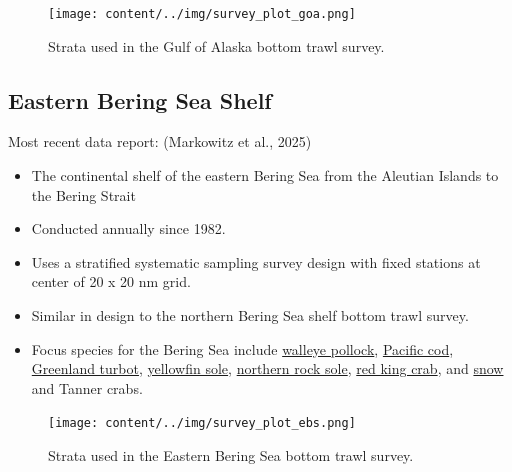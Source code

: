 \documentclass[
  letterpaper,
  oneside,
  open=any]{scrbook}
\providecommand{\tightlist}{%
  \setlength{\itemsep}{0pt}\setlength{\parskip}{0pt}}\usepackage{longtable,booktabs,array}
\begin{document}
\begin{figure}[H]

{\centering \texttt{[image: content/../img/survey\_plot\_goa.png]}

}

\caption{Strata used in the Gulf of Alaska bottom trawl survey.}

\end{figure}%

\subsection{\texorpdfstring{\textbf{Eastern Bering Sea
Shelf}}{Eastern Bering Sea Shelf}}\label{eastern-bering-sea-shelf}

Most recent data report: (Markowitz et al., 2025)

\begin{itemize}
\tightlist
\item
  The continental shelf of the eastern Bering Sea from the Aleutian
  Islands to the Bering Strait
\item
  Conducted annually since 1982.
\item
  Uses a stratified systematic sampling survey design with fixed
  stations at center of 20 x 20 nm grid.
\item
  Similar in design to the northern Bering Sea shelf bottom trawl
  survey.
\item
  Focus species for the Bering Sea include
  \href{https://www.fisheries.noaa.gov/species/alaska-pollock}{walleye
  pollock},
  \href{https://www.fisheries.noaa.gov/species/pacific-cod}{Pacific
  cod},
  \href{https://www.fisheries.noaa.gov/species/greenland-turbot}{Greenland
  turbot},
  \href{https://www.fisheries.noaa.gov/species/yellowfin-sole}{yellowfin
  sole},
  \href{https://www.fisheries.noaa.gov/species/rock-sole}{northern rock
  sole}, \href{https://www.fisheries.noaa.gov/species/red-king-crab}{red
  king crab}, and
  \href{https://www.fisheries.noaa.gov/species/alaska-snow-crab}{snow}
  and Tanner crabs.
\end{itemize}

\begin{figure}[H]

{\centering \texttt{[image: content/../img/survey\_plot\_ebs.png]}

}

\caption{Strata used in the Eastern Bering Sea bottom trawl survey.}

\end{figure}%
\end{document}
